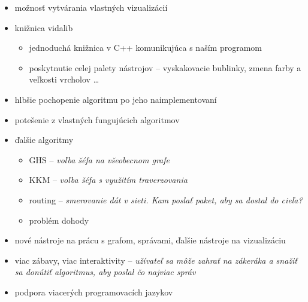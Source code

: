 
\begin{itemize}
    \item možnosť vytvárania vlastných vizualizácií
    \item knižnica vidalib
        \begin{itemize}
            \item jednoduchá knižnica v C++ komunikujúca s naším programom
            \item poskytnutie celej palety nástrojov -- vyskakovacie bublinky, zmena farby a
            veľkosti vrcholov \dots
        \end{itemize}
    \item hlbšie pochopenie algoritmu po jeho naimplementovaní
    \item potešenie z vlastných fungujúcich algoritmov
\end{itemize}




\begin{itemize}
    \item ďalšie algoritmy
    \begin{itemize}
        \item GHS -- \emph{voľba šéfa na všeobecnom grafe}
        \item KKM -- \emph{voľba šéfa s využitím traverzovania}
        \item routing -- \emph{smerovanie dát v sieti. Kam poslať paket, aby sa dostal do cieľa?}
        \item problém dohody
    \end{itemize}
    \item nové nástroje na prácu s grafom, správami, ďalšie nástroje na vizualizáciu
    \item viac zábavy, viac interaktivity -- \emph{užívateľ sa môže zahrať na zákeráka a snažiť sa
    donútiť algoritmus, aby poslal čo najviac správ}
    \item podpora viacerých programovacích jazykov
\end{itemize}

